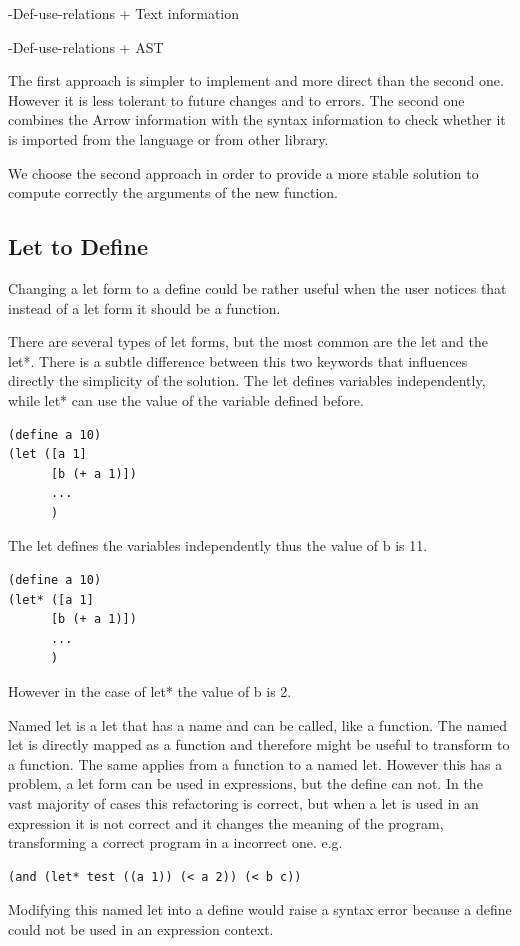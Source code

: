   -Def-use-relations + Text information

  -Def-use-relations + AST

The first approach is simpler to implement and more direct than the second one.
However it is less tolerant to future changes and to errors.
The second one combines the Arrow information with the syntax information to
check whether it is imported from the language or from other library.

We choose the second approach in order to provide a more stable solution to compute
 correctly the arguments of the new function.

\subsection{Let to Define} %
Changing a let form to a define could be rather useful when the user
notices that instead of a let form it should be a function. %

There are several types of let forms, but the most common are the let and the let*.
There is a subtle difference between this two keywords that influences directly the simplicity of the solution.
The let defines variables independently, while let* can use the value of the variable defined before.

\begin{lstlisting}[basicstyle=\ttfamily, caption="let form"]
(define a 10)
(let ([a 1]
      [b (+ a 1)])
      ...
      )
\end{lstlisting}
The let defines the variables independently thus the value of b is 11.

\begin{lstlisting}[basicstyle=\ttfamily, caption="let* form"]
(define a 10)
(let* ([a 1]
      [b (+ a 1)])
      ...
      )
\end{lstlisting}
However in the case of let* the value of b is 2.


Named let is a let that has a name and can be called, like a function.
The named let is directly mapped as a function and therefore might be useful to transform to a function.
The same applies from a function to a named let.
However this has a problem, a let form can be used in expressions, but the define can not.
In the vast majority of cases this refactoring is correct, but when a let is used in an expression
it is not correct and it changes the meaning of the program, transforming a correct
program in a incorrect one.
e.g.
\begin{lstlisting}[basicstyle=\ttfamily, caption="Let in an expression"]
(and (let* test ((a 1)) (< a 2)) (< b c))
\end{lstlisting}
Modifying this named let into a define would raise a syntax error because a
define could not be used in an expression context.

